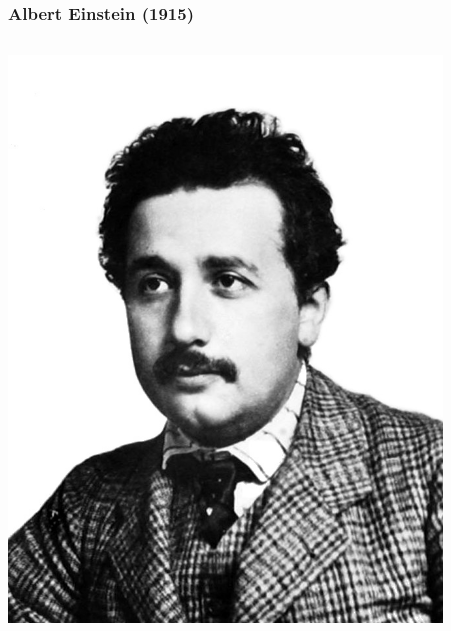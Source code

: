 \documentclass[14pt]{beamer}
\begin{document}
\begin{frame}
	\frametitle{Albert Einstein (1915)}
	\begin{center}
		\begin{columns}
			\begin{column}{0.5\textwidth}
		\includegraphics[width=0.9\textwidth]{albert_einstein.jpg}
			\end{column}
			\begin{column}{0.5\textwidth}
			\end{column}
		\end{columns}
		\vspace*{1em}
	\end{center}
\end{frame}
\end{document}
